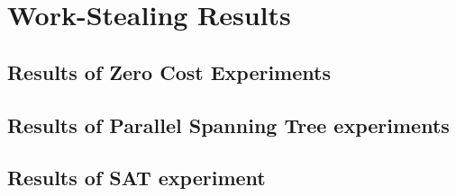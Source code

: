 \clearpage{}

\chapter{Work-Stealing Results}
\section{\label{sec:results-zero-cost}Results of Zero Cost Experiments}


\clearpage{}
\section{\label{sec:results-irreg-graph}Results of Parallel Spanning Tree experiments}


\section{\label{sec:sat-appendix}Results of SAT experiment}